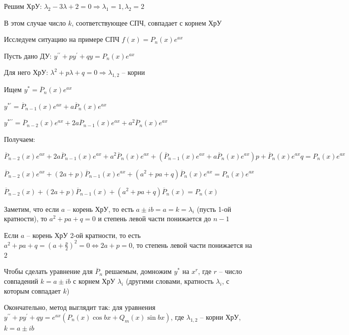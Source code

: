 \documentclass[12pt]{article}
\begin{document}
\begin{enumerate}
    Решим ХрУ: $\lambda_2 - 3\lambda + 2 = 0 \Longrightarrow \lambda_1 = 1, \lambda_2 = 2$

    В этом случае число $k$, соответствующее СПЧ, совпадает с корнем ХрУ

    \smallvspace

    Исследуем ситуацию на примере СПЧ $f(x) = P_n(x) e^{ax}$

    Пусть дано ДУ: $y^{\prime\prime} + py^\prime + qy = P_n(x)e^{ax}$

    Для него ХрУ: $\lambda^2 + p\lambda + q = 0 \Longrightarrow \lambda_{1,2}$ -- корни

    Ищем $y^* = \overline{P}_n(x) e^{ax}$

    $y^{*\prime} = \overline{P}_{n - 1} (x) e^{ax} + a\overline{P}_n(x) e^{ax}$

    $y^{*\prime\prime} = \overline{P}_{n - 2} (x) e^{ax} + 2a\overline{P}_{n - 1} (x) e^{ax} + a^2\overline{P}_n(x) e^{ax}$

    Получаем:

    $\overline{P}_{n - 2} (x) e^{ax} + 2a\overline{P}_{n - 1} (x) e^{ax} + a^2\overline{P}_n(x) e^{ax} + (\overline{P}_{n - 1} (x) e^{ax} + a\overline{P}_n(x) e^{ax})p + \overline{P}_n(x) e^{ax} q = P_n(x) e^{ax}$

    $\overline{P}_{n - 2} (x) e^{ax} + (2a + p)\overline{P}_{n - 1} (x) e^{ax} + (a^2 + pa + q)\overline{P}_n(x) e^{ax} = P_n(x) e^{ax}$

    $\overline{P}_{n - 2} (x) + (2a + p)\overline{P}_{n - 1} (x) + (a^2 + pa + q)\overline{P}_n(x) = P_n(x)$

    \smallvspace

    Заметим, что если $a$ -- корень ХрУ, то есть $a \pm ib = a = k = \lambda_i$ (пусть 1-ой кратности), то $a^2 + pa + q = 0$ и степень
    левой части понижается до $n - 1$

    Если $a$ -- корень ХрУ 2-ой кратности, то есть $a^2 + pa + q = \left(a + \frac{p}{2}\right)^2 = 0 \Longleftrightarrow 2a + p = 0$, то степень левой части понижается на $2$

    Чтобы сделать уравнение для $\overline{P}_n$ решаемым, домножим $y^*$ на $x^r$, где $r$ -- число совпадений $k = a \pm ib$ с корнем ХрУ $\lambda_i$ (другими словами, кратность $\lambda_i$, с которым совпадает $k$)

    \mediumvspace

    Окончательно, метод выглядит так: для уравнения $y^{\prime\prime} + py^\prime + qy = e^{ax} (P_n(x)\cos bx + Q_m (x)\sin bx)$, где $\lambda_{1,2}$ -- корни ХрУ, $k = a \pm ib$


\end{enumerate}
\end{document}
